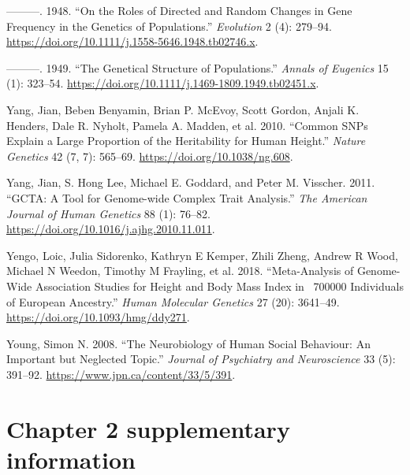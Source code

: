 \documentclass[
]{book}
\newlength{\cslhangindent}
\newlength{\cslentryspacingunit} %
\newenvironment{CSLReferences}[2] %
 {%
  \setlength{\parindent}{0pt}
  \ifodd #1
  \let\oldpar\par
  \def\par{\hangindent=\cslhangindent\oldpar}
  \fi
  \setlength{\parskip}{#2\cslentryspacingunit}
 }%
 {}
\begin{document}
\begin{CSLReferences}{1}{0}
\leavevmode{}%
---------. 1948. {``On the {Roles} of {Directed} and {Random Changes} in {Gene Frequency} in the {Genetics} of {Populations}.''} \emph{Evolution} 2 (4): 279--94. \url{https://doi.org/10.1111/j.1558-5646.1948.tb02746.x}.

\leavevmode{}%
---------. 1949. {``The {Genetical Structure} of {Populations}.''} \emph{Annals of Eugenics} 15 (1): 323--54. \url{https://doi.org/10.1111/j.1469-1809.1949.tb02451.x}.

\leavevmode{}%
Yang, Jian, Beben Benyamin, Brian P. McEvoy, Scott Gordon, Anjali K. Henders, Dale R. Nyholt, Pamela A. Madden, et al. 2010. {``Common {SNPs} Explain a Large Proportion of the Heritability for Human Height.''} \emph{Nature Genetics} 42 (7, 7): 565--69. \url{https://doi.org/10.1038/ng.608}.

\leavevmode{}%
Yang, Jian, S. Hong Lee, Michael E. Goddard, and Peter M. Visscher. 2011. {``{GCTA}: {A Tool} for {Genome-wide Complex Trait Analysis}.''} \emph{The American Journal of Human Genetics} 88 (1): 76--82. \url{https://doi.org/10.1016/j.ajhg.2010.11.011}.

\leavevmode{}%
Yengo, Loic, Julia Sidorenko, Kathryn E Kemper, Zhili Zheng, Andrew R Wood, Michael N Weedon, Timothy M Frayling, et al. 2018. {``Meta-Analysis of Genome-Wide Association Studies for Height and Body Mass Index in ~700000 Individuals of {European} Ancestry.''} \emph{Human Molecular Genetics} 27 (20): 3641--49. \url{https://doi.org/10.1093/hmg/ddy271}.

\leavevmode{}%
Young, Simon N. 2008. {``The Neurobiology of Human Social Behaviour: An Important but Neglected Topic.''} \emph{Journal of Psychiatry and Neuroscience} 33 (5): 391--92. \url{https://www.jpn.ca/content/33/5/391}.

\end{CSLReferences}

\hypertarget{appendix-appendix}{%
\appendix}


\hypertarget{chapter-2-supplementary-information}{%
\chapter{Chapter 2 supplementary information}\label{chapter-2-supplementary-information}}
\end{document}
